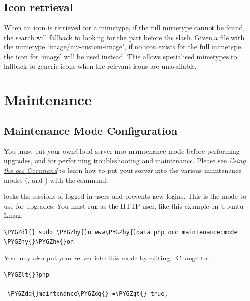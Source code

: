 \documentclass[letterpaper,10pt,english]{sphinxmanual}
\def\PYGZlt{\char`\<}
\def\PYGZgt{\char`\>}
\def\PYGZdl{\char`\$}
\def\PYGZhy{\char`\-}
\def\PYGZdq{\char`\"}
\begin{document}
\section{Icon retrieval}
\label{configuration_mimetypes/index:icon-retrieval}
When an icon is retrieved for a mimetype, if the full mimetype cannot be found,
the search will fallback to looking for the part before the slash. Given a file
with the mimetype `image/my-custom-image', if no icon exists for the full
mimetype, the icon for `image' will be used instead. This allows specialised
mimetypes to fallback to generic icons when the relevant icons are unavailable.


\chapter{Maintenance}
\label{maintenance/index::doc}\label{maintenance/index:maintenance}

\section{Maintenance Mode Configuration}
\label{maintenance/enable_maintenance:maintenance-mode-configuration}\label{maintenance/enable_maintenance::doc}
You must put your ownCloud server into maintenance mode before performing
upgrades, and for performing troubleshooting and maintenance. Please
see {\hyperref[configuration_server/occ_command::doc]{\emph{\emph{Using the occ Command}}}} to learn how to put your server into
the various maintenance modes (,
and ) with the  command.

 locks the sessions of logged-in users and prevents new
logins. This is the mode to use for upgrades. You must run  as the HTTP user,
like this example on Ubuntu Linux:

\begin{Verbatim}[commandchars=\\\{\}]
\PYGZdl{} sudo \PYGZhy{}u www\PYGZhy{}data php occ maintenance:mode \PYGZhy{}\PYGZhy{}on
\end{Verbatim}

You may also put your
server into this mode by editing . Change
 to :

\begin{Verbatim}[commandchars=\\\{\}]
\PYGZlt{}?php

 \PYGZdq{}maintenance\PYGZdq{} =\PYGZgt{} true,
\end{Verbatim}
\end{document}
